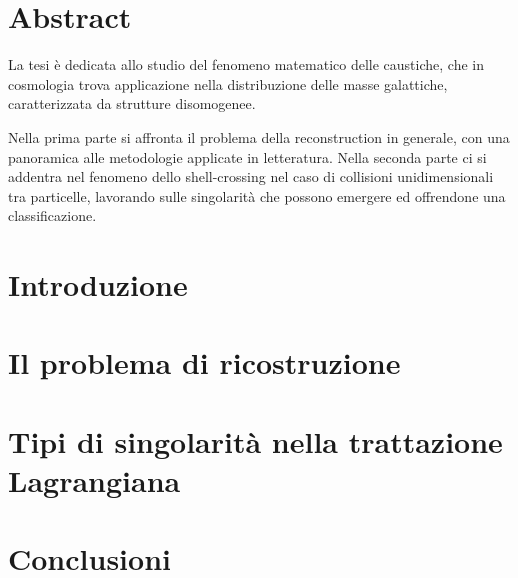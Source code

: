 \documentclass[a4paper,11pt,oneside]{book}
\begin{document}
    

    \mainmatter

    \clearpage %
    \begingroup
    \pagestyle{empty}
    \null
    \newpage
    \endgroup
    
	    
    \chapter*{Abstract}
    La tesi è dedicata allo studio del fenomeno matematico delle caustiche, che in cosmologia trova applicazione
    nella distribuzione delle masse galattiche, caratterizzata da strutture disomogenee.

    Nella prima parte si affronta il problema della reconstruction in generale, con una panoramica alle 
    metodologie applicate in letteratura. Nella seconda parte ci si addentra nel fenomeno dello 
    shell-crossing nel caso di collisioni unidimensionali tra particelle, lavorando sulle singolarità
    che possono emergere ed offrendone una classificazione.
    


    \tableofcontents

    \chapter*{Introduzione}
    

    \chapter{Il problema di ricostruzione}
    


    \chapter{Tipi di singolarità nella trattazione Lagrangiana}
    


    \chapter*{Conclusioni}

    

    \nocite{*}
    \printbibliography
\end{document}

